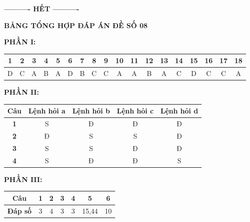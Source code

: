 \documentclass[11pt,a4paper]{article}
\begin{document}
\vspace{0.1cm}
\begin{center}
	\textbf{---------- HẾT ----------}
\end{center}

\vspace{0.3cm}
\noindent
\textbf{\large\color{mainGreen}BẢNG TỔNG HỢP ĐÁP ÁN ĐỀ SỐ 08}

\vspace{0.2cm}
\noindent\textbf{PHẦN I:}\\
\begin{tabular}{|c|c|c|c|c|c|c|c|c|c|c|c|c|c|c|c|c|c|}
\hline
\textbf{1} & \textbf{2} & \textbf{3} & \textbf{4} & \textbf{5} & \textbf{6} & \textbf{7} & \textbf{8} & \textbf{9} & \textbf{10} & \textbf{11} & \textbf{12} & \textbf{13} & \textbf{14} & \textbf{15} & \textbf{16} & \textbf{17} & \textbf{18} \\
\hline
D & C & A & B & A & D & B & C & C & A & A & B & A & C & D & C & C & A \\
\hline
\end{tabular}

\vspace{0.3cm}
\noindent\textbf{PHẦN II:}\\
\begin{tabular}{|c|c|c|c|c|}
\hline
\textbf{Câu} & \textbf{Lệnh hỏi a} & \textbf{Lệnh hỏi b} & \textbf{Lệnh hỏi c} & \textbf{Lệnh hỏi d} \\
\hline
\textbf{1} & S & Đ & Đ & Đ \\
\hline
\textbf{2} & Đ & S & S & Đ \\
\hline
\textbf{3} & S & S & Đ & Đ \\
\hline
\textbf{4} & S & Đ & Đ & S \\
\hline
\end{tabular}

\vspace{0.3cm}
\noindent\textbf{PHẦN III:}\\
\begin{tabular}{|c|c|c|c|c|c|c|}
\hline
\textbf{Câu} & \textbf{1} & \textbf{2} & \textbf{3} & \textbf{4} & \textbf{5} & \textbf{6} \\
\hline
\textbf{Đáp số} & 3 & 4 & 3 & 3 & 15,44 & 10 \\
\hline
\end{tabular}
\end{document}

